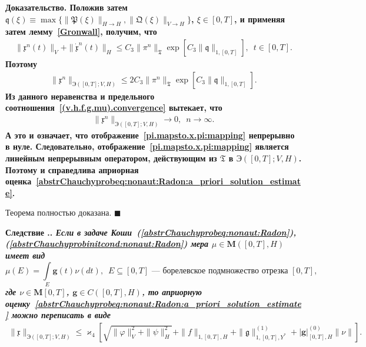 \documentclass{report}
\newcounter{cor}[section]
\renewcommand{\thecor}{\thesection.\arabic{cor}}
\newenvironment{Corrolary}{\par\refstepcounter{cor}\bf Следствие \thecor. \it}{\rm\par}
\newenvironment{Proof}{\par\noindent\bf Доказательство.\rm}{ $\blacksquare$\par}
\begin{document}
\begin{Proof}
Положив затем $\mathfrak{q}(\xi)\equiv\max\{\|\mathfrak{P}(\xi)\|_{H\to H},\|\mathfrak{Q}(\xi)\|_{V\to H}\}$, $\xi\in[0,T]$, и применяя затем лемму~\ref{Gronwall}, получим, что
\begin{gather*}
\|\mathfrak{x}^n(t)\|_V+\|\dot{\mathfrak{x}}^n(t)\|_H\leqslant C_3\|\pi^n\|_{\mathfrak{T}}\exp\left[C_3\|\mathfrak{q}\|_{1,[0,T]}\right],\,\,\,t\in[0,T].
\end{gather*}
Поэтому
\begin{gather*}
\|\mathfrak{x}^n\|_{{\textrm{Э}}{}([0,T];V,H)}\leqslant2C_3\|\pi^n\|_{\mathfrak{T}}\exp\left[C_3\|\mathfrak{q}\|_{1,[0,T]}\right].
\end{gather*}
Из данного неравенства и предельного соотношения~\eqref{(v.h.f.g.mu).convergence} вытекает, что
\begin{gather*}
\|\mathfrak{x}^n\|_{{\textrm{Э}}{}([0,T];V,H)}\to0,\,\,\,n\to\infty.
\end{gather*}
А это и означает, что отображение~\eqref{pi.mapsto.x.pi:mapping} непрерывно в нуле. Следовательно, отображение~\eqref{pi.mapsto.x.pi:mapping} является линейным непрерывным оператором, действующим из $\mathfrak{T}$ в
${\textrm{Э}}{}([0,T];V,H)$. Поэтому и справедлива априорная оценка~\eqref{abstrChauchyprobeq:nonaut:Radon:a_priori_solution_estimate}. 

Теорема полностью доказана.
\end{Proof}

\begin{Corrolary}\label{abstrChauchyprobeq:nonaut:Radon:g.mu}
Если в задаче Коши~(\ref{abstrChauchyprobeq:nonaut:Radon}), (\ref{abstrChauchyprobinitcond:nonaut:Radon}) мера $\mu\in\mathbf{M}([0,T],H)$ имеет вид
$$
\mu(E)=\int\limits_E\mathbf{g}(t)\nu(dt),\,\,\,\text{$E\subseteq[0,T]$ --- борелевское подмножество отрезка $[0,T]$},
$$
где $\nu\in \mathbf{M}[0,T]$, $\mathbf{g}\in C([0,T],H)$, то априорную оценку~\eqref{abstrChauchyprobeq:nonaut:Radon:a_priori_solution_estimate} можно переписать в виде
\begin{gather}\label{abstrChauchyprobeq:nonaut:Radon:a_priori_solution_estimate:1}
\|\mathfrak{x}\|_{{\textrm{Э}}([0,T];V,H)}\leqslant \varkappa_4[\sqrt{\|\varphi\|^2_V+\|\psi\|_H^2}+ \|f\|_{1,[0,T],H}+\|\mathfrak{g}\|^{(1)}_{1,[0,T],Y^*}+\pmb{|}\mathbf{g}\pmb{|}^{(0)}_{[0,T],H}\|\nu\|].
\end{gather}
\end{Corrolary}
	    
\end{document}
